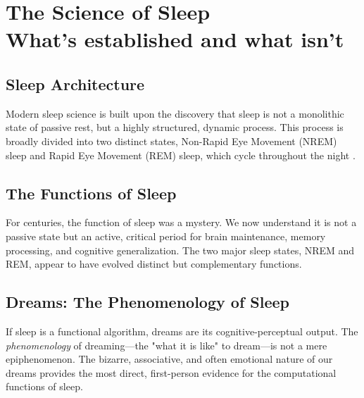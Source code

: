 \part{The Science of Sleep\\ \large What’s established and what isn't}\label{part:science_of_sleep}
\newpage

\chapter{Sleep Architecture}\label{ch:architecture}
Modern sleep science is built upon the discovery that sleep is not a monolithic state of passive rest, but a highly structured, dynamic process. This process is broadly divided into two distinct states, Non-Rapid Eye Movement (NREM) sleep and Rapid Eye Movement (REM) sleep, which cycle throughout the night \citep{fuller2006}.




\chapter{The Functions of Sleep}\label{ch:functions}
For centuries, the function of sleep was a mystery. We now understand it is not a passive state but an active, critical period for brain maintenance, memory processing, and cognitive generalization. The two major sleep states, NREM and REM, appear to have evolved distinct but complementary functions.





\chapter{Dreams: The Phenomenology of Sleep}\label{ch:phenomenology}
If sleep is a functional algorithm, dreams are its cognitive-perceptual output. The \textit{phenomenology} of dreaming—the "what it is like" to dream—is not a mere epiphenomenon. The bizarre, associative, and often emotional nature of our dreams provides the most direct, first-person evidence for the computational functions of sleep.





%

